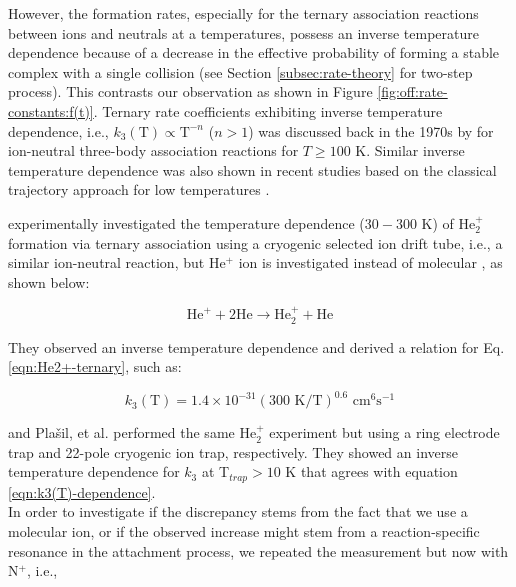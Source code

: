 However, the formation rates, especially for the ternary association reactions
between ions and neutrals at a temperatures, possess an inverse temperature
dependence because of a decrease in the effective probability of forming a
stable complex with a single collision \cite{herbst_dense_1988} (see Section
\ref{subsec:rate-theory} for two-step process). This contrasts our observation
as shown in Figure \ref{fig:off:rate-constants:f(t)}. Ternary rate coefficients exhibiting
inverse temperature dependence, i.e., $k_3 (\text{T}) \propto \text{T}^{-n}$ ($n > 1$) 
was discussed back in the 1970s by \citet{Herbst1979} for ion-neutral
three-body association reactions for $T \geq 100$ K.
Similar inverse temperature dependence was also shown in recent studies based on the classical trajectory approach for low temperatures \cite{perez-rios_communication_2015, greene_universal_2017}.

\citet{bohringer_temperature_1983} experimentally investigated the temperature dependence ($30-300$ K) of He$_2^+$ formation via ternary association using a cryogenic selected ion drift tube, i.e., a similar ion-neutral reaction, but He$^+$ ion is investigated instead of molecular \CD, as shown below:

\begin{equation}
    \text{He}^+ + 2\text{He} \rightarrow \text{He}_2^+ + \text{He}
    \label{eqn:He2+-ternary}
\end{equation}

They observed an inverse temperature dependence and derived a relation for Eq.
\ref{eqn:He2+-ternary}, such as:

\begin{equation}
    k_3 (\text{T}) = 1.4 \times 10^{-31} (300 \text{ K} / \text{T})^{0.6} \text{ cm}^6\text{s}^{-1}
    \label{eqn:k3(T)-dependence}
\end{equation}

\citet{gerlich_experimental_1993} and Pla\v{s}il, et al. \cite{plasil_stabilization_2012} performed the same He$_2^+$ experiment but using a ring electrode trap and 22-pole cryogenic ion trap, respectively. They showed an inverse temperature dependence for $k_3$ at T$_{trap}>10$ K that agrees with equation \ref{eqn:k3(T)-dependence}.\\

In order to investigate if the discrepancy stems from the fact that we use a
molecular ion, or if the observed increase might stem from a reaction-specific
resonance in the attachment process, we repeated the measurement but now with
N$^+$, i.e.,

